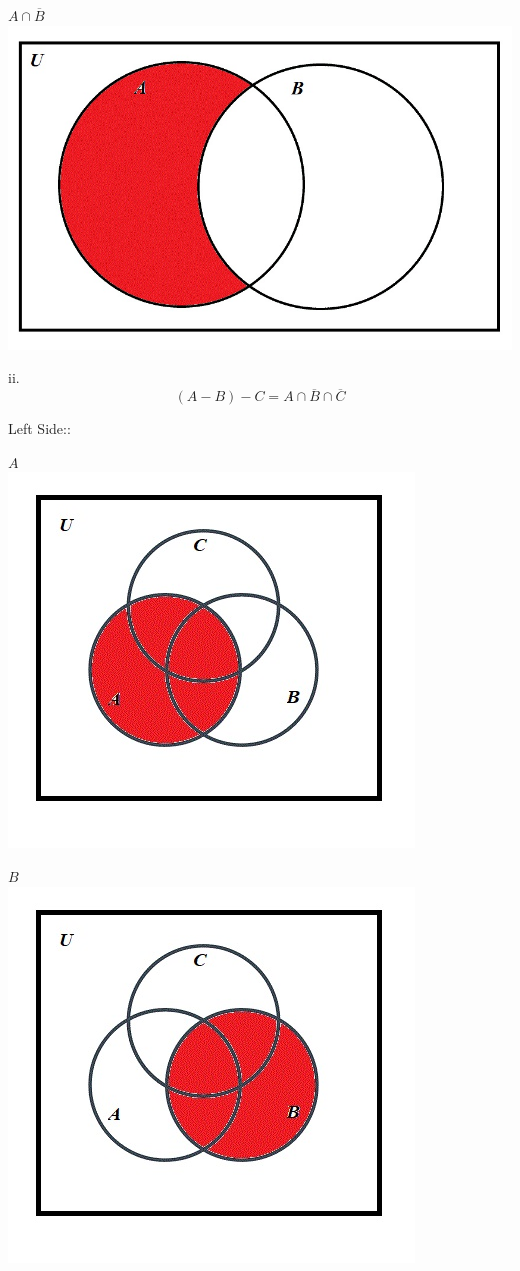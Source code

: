 \documentclass[10pt]{article}
\begin{document}
$A \cap \overline{B}$\\
\includegraphics[scale=0.3]{11}

ii.
$$(A - B) - C = A \cap \overline{B} \cap \overline{C}$$

Left Side::

$A$\\
\includegraphics[scale=0.55]{12}

$B$\\
\includegraphics[scale=0.55]{13}
\end{document}
